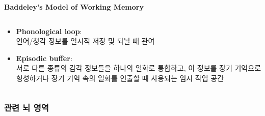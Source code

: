 \documentclass{beamer}
\begin{document}
\begin{frame}{\textbf{Baddeley's Model of Working Memory}}
\begin{columns}
\begin{column}{0.62\textwidth}
\begin{itemize}
        \item \textbf{Phonological loop}: \\언어/청각 정보를 일시적 저장 및 되뇔 때 관여
        \item \textbf{Episodic buffer}: \\서로 다른 종류의 감각 정보들을 하나의 일화로 통합하고, 이 정보를 장기 기억으로 형성하거나 장기 기억 속의 일화를 인출할 때 사용되는 임시 작업 공간
      \end{itemize}
    \end{column}
  \end{columns}
\end{frame}

\subsubsection{관련 뇌 영역}
\end{document}
